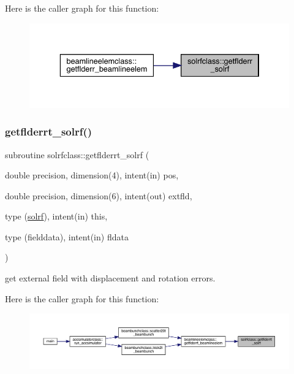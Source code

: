 Here is the caller graph for this function\+:\nopagebreak
\begin{figure}[H]
\begin{center}
\leavevmode
\includegraphics[width=336pt]{namespacesolrfclass_a8a44826fce541cba8b4f7f5573ec7c98_icgraph}
\end{center}
\end{figure}
\mbox{\label{namespacesolrfclass_a81aef201f157970a5566536d7738c3f9}} 
\subsubsection{\texorpdfstring{getflderrt\_solrf()}{getflderrt\_solrf()}}
{\footnotesize\ttfamily subroutine solrfclass\+::getflderrt\+\_\+solrf (\begin{DoxyParamCaption}\item[{double precision, dimension(4), intent(in)}]{pos,  }\item[{double precision, dimension(6), intent(out)}]{extfld,  }\item[{type (\mbox{\hyperlink{namespacesolrfclass_structsolrfclass_1_1solrf}{solrf}}), intent(in)}]{this,  }\item[{type (fielddata), intent(in)}]{fldata }\end{DoxyParamCaption})}



get external field with displacement and rotation errors. 

Here is the caller graph for this function\+:\nopagebreak
\begin{figure}[H]
\begin{center}
\leavevmode
\includegraphics[width=350pt]{namespacesolrfclass_a81aef201f157970a5566536d7738c3f9_icgraph}
\end{center}
\end{figure}
\mbox{\label{namespacesolrfclass_ac164c5b7477e8ec4278009bd85cd4338}} 
